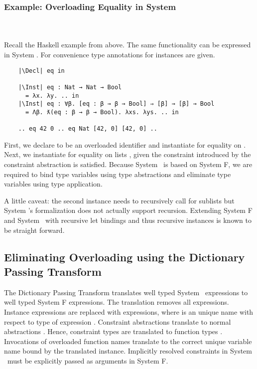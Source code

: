 \subsubsection{Example: Overloading Equality in System \Fo}\hfill\\\\
Recall the Haskell example from above. 
The same functionality can be expressed in System \Fo. 
For convenience type annotations for instances are given.
\begin{verbatim}
    |\Decl| eq in

    |\Inst| eq : Nat → Nat → Bool 
      = λx. λy. .. in
    |\Inst| eq : ∀β. [eq : β → β → Bool] ⇒ [β] → [β] → Bool 
      = Λβ. ƛ(eq : β → β → Bool). λxs. λys. .. in

    .. eq 42 0 .. eq Nat [42, 0] [42, 0] .. 
\end{verbatim} 
First, we declare  to be an overloaded identifier and instantiate  for equality on . 
Next, we instantiate  for equality on lists \inl{[β]}, given the constraint  introduced by the constraint abstraction  is satisfied. 
Because System \Fo\ is based on System F, we are required to bind type variables using type abstractions  and eliminate type variables using type application. 

\noindent A little caveat: the second instance needs to recursively call  for sublists but System \Fo's formalization does not actually support recursion. Extending System F and System \Fo\ with recursive let bindings and thus recursive instances is known to be straight forward. 

\subsection{Eliminating Overloading using the Dictionary Passing Transform}
The Dictionary Passing Transform translates well typed System \Fo\ expressions to well typed System F expressions. 
The translation removes all  expressions. Instance expressions  are replaced with  expressions, where  is an unique name with respect to type  of expression . 
Constraint abstractions  translate to normal abstractions . 
Hence, constraint types  are translated to function types . 
Invocations of overloaded function names  translate to the correct unique variable name  bound by the translated instance.
Implicitly resolved constraints in System \Fo\ must be explicitly passed as arguments in System F.

